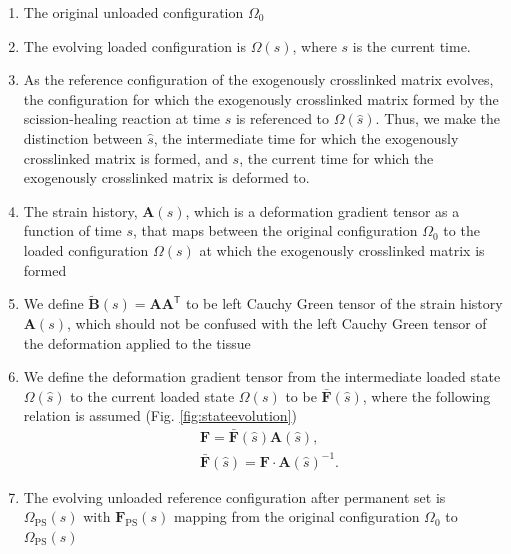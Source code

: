 \begin{enumerate}

\item The original unloaded configuration $\Omega_0$ 

\item The evolving loaded configuration is $\Omega(s)$, where $s$ is the current time. 

\item As the reference configuration of the exogenously crosslinked matrix evolves, the configuration for which the exogenously crosslinked matrix formed by the scission-healing reaction at time $\hat{s}$ is referenced to $\Omega(\hat{s})$. Thus, we make the distinction between $\hat{s}$, the intermediate time for which the exogenously crosslinked matrix is formed, and $s$, the current time for which the exogenously crosslinked matrix is deformed to. 

\item The strain history, $\mathbf{A}(s)$, which is a deformation gradient tensor as a function of time $s$, that maps between the original configuration $\Omega_0$ to the loaded configuration $\Omega(s)$ at which the exogenously crosslinked matrix is formed

\item We define $\tilde{\mathbf{B}}(s) = \mathbf{A}\mathbf{A}^\mathsf{T}$ to be left Cauchy Green tensor of the strain history $\mathbf{A}(s)$, which should not be confused with the left Cauchy Green tensor of the deformation applied to the tissue

\item We define the deformation gradient tensor from the intermediate loaded state $\Omega(\hat{s})$ to the current loaded state $\Omega(s)$ to be $\mathbf{\bar{F}}(\hat{s})$, where the following relation is assumed (Fig. \ref{fig:stateevolution})
\begin{equation} \label{eq:strainhistory}
\begin{split}
&\mathbf{F} = \mathbf{\bar{F}}(\hat{s})\mathbf{A}(\hat{s}), \\
&\mathbf{\bar{F}}(\hat{s}) = \mathbf{F} \cdot \mathbf{A}(\hat{s})^{-1}.
\end{split}
\end{equation}

\item The evolving unloaded reference configuration after permanent set is $\Omega_\mathrm{PS}(s)$ with $\mathbf{F}_\mathrm{PS}(s)$ mapping from the original configuration $\Omega_0$ to $\Omega_\mathrm{PS}(s)$ 

\end{enumerate}

